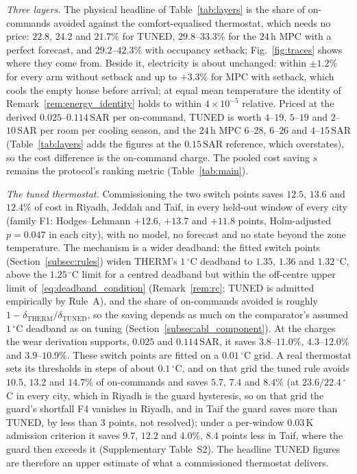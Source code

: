\documentclass[pdflatex,sn-mathphys-num,iicol]{sn-jnl}
\theoremstyle{thmstyleone}\newtheorem{proposition}{Proposition}\newtheorem{corollary}{Corollary}
\theoremstyle{thmstyletwo}\newtheorem{remark}{Remark}\newtheorem{observation}{Observation}
\theoremstyle{thmstylethree}\newtheorem{definition}{Definition}
\newcommand{\SAR}{\text{SAR}}
\begin{document}
\emph{Three layers.} The physical headline of Table~\ref{tab:layers} is the share of on-commands avoided against the comfort-equalised thermostat, which needs no price: $22.8$, $24.2$ and $21.7\%$ for TUNED, $29.8$--$33.3\%$ for the $24\,$h MPC with a perfect forecast, and $29.2$--$42.3\%$ with occupancy setback; Fig.~\ref{fig:traces} shows where they come from. Beside it, electricity is about unchanged: within $\pm1.2\%$ for every arm without setback and up to $+3.3\%$ for MPC with setback, which cools the empty house before arrival; at equal mean temperature the identity of Remark~\ref{rem:energy_identity} holds to within $4\times10^{-5}$ relative. Priced at the derived $0.025$--$0.114\,\SAR$ per on-command, TUNED is worth $4$--$19$, $5$--$19$ and $2$--$10\,\SAR$ per room per cooling season, and the $24\,$h MPC $6$--$28$, $6$--$26$ and $4$--$15\,\SAR$ (Table~\ref{tab:layers} adds the figures at the $0.15\,\SAR$ reference, which overstates), so the cost difference is the on-command charge. The pooled cost saving $s$ remains the protocol's ranking metric (Table~\ref{tab:main}).



\emph{The tuned thermostat.} Commissioning the two switch points saves $12.5$, $13.6$ and $12.4\%$ of cost in Riyadh, Jeddah and Taif, in every held-out window of every city (family F1: Hodges--Lehmann $+12.6$, $+13.7$ and $+11.8$ points, Holm-adjusted $p=0.047$ in each city), with no model, no forecast and no state beyond the zone temperature. The mechanism is a wider deadband: the fitted switch points (Section~\ref{subsec:rules}) widen THERM's $1\,^\circ$C deadband to $1.35$, $1.36$ and $1.32\,^\circ$C, above the $1.25\,^\circ$C limit for a centred deadband but within the off-centre upper limit of~\eqref{eq:deadband_condition} (Remark~\ref{rem:rc}; TUNED is admitted empirically by Rule~A), and the share of on-commands avoided is roughly $1-\delta_{\mathrm{THERM}}/\delta_{\mathrm{TUNED}}$, so the saving depends as much on the comparator's assumed $1\,^\circ$C deadband as on tuning (Section~\ref{subsec:abl_component}). At the charges the wear derivation supports, $0.025$ and $0.114\,\SAR$, it saves $3.8$--$11.0\%$, $4.3$--$12.0\%$ and $3.9$--$10.9\%$. These switch points are fitted on a $0.01\,^\circ$C grid. A real thermostat sets its thresholds in steps of about $0.1\,^\circ$C, and on that grid the tuned rule avoids $10.5$, $13.2$ and $14.7\%$ of on-commands and saves $5.7$, $7.4$ and $8.4\%$ (at $23.6/22.4\,^\circ$C in every city, which in Riyadh is the guard hysteresis, so on that grid the guard's shortfall F4 vanishes in Riyadh, and in Taif the guard saves more than TUNED, by less than $3$ points, not resolved); under a per-window $0.03\,$K admission criterion it saves $9.7$, $12.2$ and $4.0\%$, $8.4$ points less in Taif, where the guard then exceeds it (Supplementary Table~S2). The headline TUNED figures are therefore an upper estimate of what a commissioned thermostat delivers.
\end{document}
